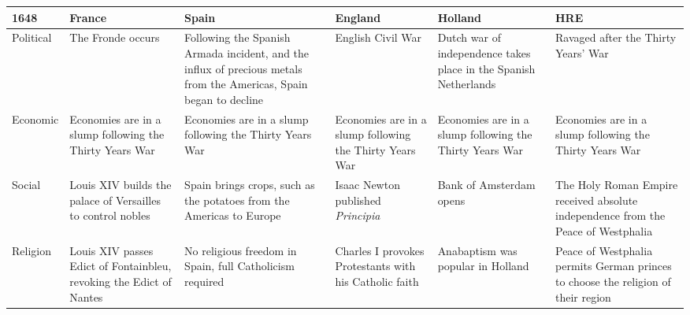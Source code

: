 \documentclass[12pt]{article}
\begin{document}
\begin{enumerate}
\begin{tabular}{|p{}|p{}|p{}|p{}|p{}|p{}|}
\hline
1648 & France & Spain & England & Holland & HRE \\
\hline
Political & The Fronde occurs & Following the Spanish Armada incident, and the influx of precious metals from the Americas, Spain began to decline & English Civil War & Dutch war of independence takes place in the Spanish Netherlands & Ravaged after the Thirty Years' War \\
\hline
Economic & Economies are in a slump following the Thirty Years War & Economies are in a slump following the Thirty Years War & Economies are in a slump following the Thirty Years War & Economies are in a slump following the Thirty Years War &  Economies are in a slump following the Thirty Years War \\
\hline
Social & Louis XIV builds the palace of Versailles to control nobles & Spain brings crops, such as the potatoes from the Americas to Europe & Isaac Newton published \textit{Principia} & Bank of Amsterdam opens & The Holy Roman Empire received absolute independence from the Peace of Westphalia  \\
\hline
Religion & Louis XIV passes Edict of Fontainbleu, revoking the Edict of Nantes & No religious freedom in Spain, full Catholicism required & Charles I provokes Protestants with his Catholic faith & Anabaptism was popular in Holland & Peace of Westphalia permits German princes to choose the religion of their region \\
\hline


\end{tabular}

\hspace{-25pt} \begin{tabular}{|p{}|p{}|p{}|}


\end{tabular}
\end{enumerate}
\end{document}
